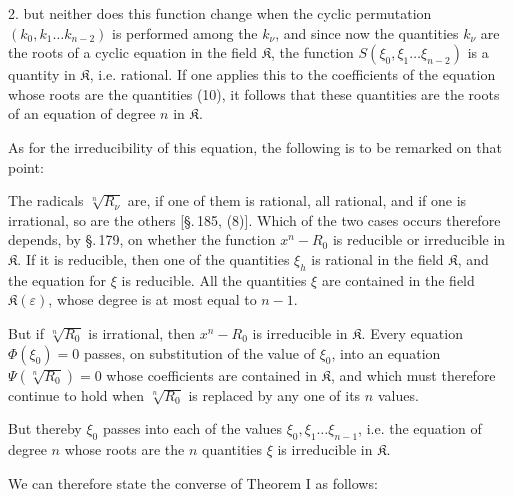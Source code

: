 2. but neither does this function change when the cyclic permutation $(k_0, k_1 \ldots k_{n-2})$ is performed among the $k_\nu$, and since now the quantities $k_\nu$ are the roots of a cyclic equation in the field $\mathfrak{K}$, the function $S(\xi_0, \xi_1 \ldots \xi_{n-2})$ is a quantity in $\mathfrak{K}$, i.e. rational. If one applies this to the coefficients of the equation whose roots are the quantities (10), it follows that these quantities are the roots of an equation of degree $n$ in $\mathfrak{K}$.

As for the irreducibility of this equation, the following is to be remarked on that point:

The radicals $\sqrt[n]{R_\nu}$ are, if one of them is rational, all rational, and if one is irrational, so are the others [§.\,185, (8)]. Which of the two cases occurs therefore depends, by §.\,179, on whether the function $x^n - R_0$ is reducible or irreducible in $\mathfrak{K}$. If it is reducible, then one of the quantities $\xi_h$ is rational in the field $\mathfrak{K}$, and the equation for $\xi$ is reducible. All the quantities $\xi$ are contained in the field $\mathfrak{K}(\varepsilon)$, whose degree is at most equal to $n-1$.

But if $\sqrt[n]{R_0}$ is irrational, then $x^n - R_0$ is irreducible in $\mathfrak{K}$. Every equation $\Phi(\xi_0) = 0$ passes, on substitution of the value of $\xi_0$, into an equation $\Psi\!\left(\sqrt[n]{R_0}\right) = 0$ whose coefficients are contained in $\mathfrak{K}$, and which must therefore continue to hold when $\sqrt[n]{R_0}$ is replaced by any one of its $n$ values.

But thereby $\xi_0$ passes into each of the values $\xi_0, \xi_1 \ldots \xi_{n-1}$, i.e. the equation of degree $n$ whose roots are the $n$ quantities $\xi$ is irreducible in $\mathfrak{K}$.

We can therefore state the converse of Theorem I as follows:

